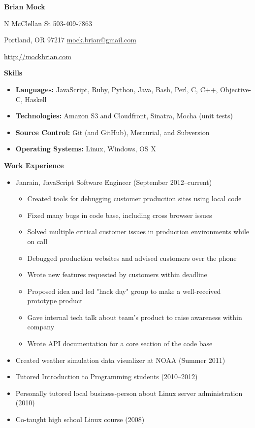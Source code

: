 \documentclass[10pt]{article}
\begin{document}
\noindent
\begin{center}
\textbf{\Large Brian Mock}
\end{center}

 N McClellan St
\hfill
503-409-7863

\noindent
Portland, OR 97217
\hfill
\url{mock.brian@gmail.com}

\noindent
\hfill
\url{http://mockbrian.com}

\bigskip
\smallskip

\noindent \textbf{Skills} \hrulefill
\begin{itemize}
\item \textbf{Languages:} JavaScript, Ruby, Python, Java, Bash, Perl, C, C++, Objective-C, Haskell
\item \textbf{Technologies:} Amazon S3 and Cloudfront, Sinatra, Mocha
(unit tests)
\item \textbf{Source Control:} Git (and GitHub), Mercurial, and Subversion
\item \textbf{Operating Systems:} Linux, Windows, OS X
\end{itemize}

\medskip
\noindent \textbf{Work Experience} \hrulefill
\begin{itemize}
\item Janrain, JavaScript Software Engineer  (September 2012\---current)
    \begin{itemize}
    \item Created tools for debugging customer production sites using
    local code
    \item Fixed many bugs in code base, including cross browser issues
    \item Solved multiple critical customer issues in production
    environments while on call
    \item Debugged production websites and advised customers over the
    phone
    \item Wrote new features requested by customers within deadline
    \item Proposed idea and led "hack day" group to make a well-received
    prototype product
    \item Gave internal tech talk about team's product to raise
    awareness within company
    \item Wrote API documentation for a core section of the code base
    \end{itemize}
\item Created weather simulation data visualizer at NOAA (Summer 2011)
\item Tutored Introduction to Programming students (2010\---2012)
\item Personally tutored local business-person about Linux server
administration (2010)
\item Co-taught high school Linux course (2008)
\end{itemize}
\end{document}
